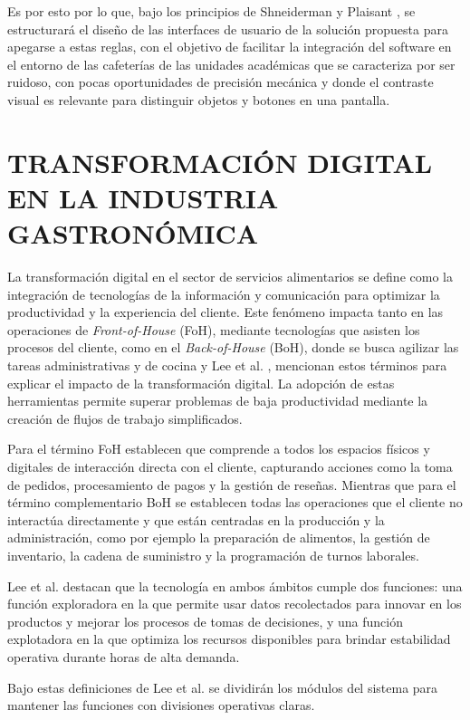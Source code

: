 Es por esto por lo que, bajo los principios de Shneiderman y Plaisant \cite{shneiderman2005designing}, se estructurará el diseño de las interfaces de usuario de la solución propuesta para apegarse a estas reglas, con el objetivo de facilitar la integración del software en el entorno de las cafeterías de las unidades académicas que se caracteriza por ser ruidoso, con pocas oportunidades de precisión mecánica y donde el contraste visual es relevante para distinguir objetos y botones en una pantalla.

\section{TRANSFORMACIÓN DIGITAL EN LA INDUSTRIA GASTRONÓMICA}
La transformación digital en el sector de servicios alimentarios se define como la integración de tecnologías de la información y comunicación para optimizar la productividad y la experiencia del cliente. Este fenómeno impacta tanto en las operaciones de \textit{Front-of-House} (FoH), mediante tecnologías que asisten los procesos del cliente, como en el \textit{Back-of-House} (BoH), donde se busca agilizar las tareas administrativas y de cocina y Lee et al. \cite{woojin2024effect}, \cite{woojin2026multifaceted} mencionan estos términos para explicar el impacto de la transformación digital. La adopción de estas herramientas permite superar problemas de baja productividad mediante la creación de flujos de trabajo simplificados.

Para el término FoH establecen que comprende a todos los espacios físicos y digitales de interacción directa con el cliente, capturando acciones como la toma de pedidos, procesamiento de pagos y la gestión de reseñas. Mientras que para el término complementario BoH se establecen todas las operaciones que el cliente no interactúa directamente y que están centradas en la producción y la administración, como por ejemplo la preparación de alimentos, la gestión de inventario, la cadena de suministro y la programación de turnos laborales. 

Lee et al. destacan que la tecnología en ambos ámbitos cumple dos funciones: una función exploradora en la que permite usar datos recolectados para innovar en los productos y mejorar los procesos de tomas de decisiones, y una función explotadora en la que optimiza los recursos disponibles para brindar estabilidad operativa durante horas de alta demanda. 

Bajo estas definiciones de Lee et al. \cite{woojin2026multifaceted} se dividirán los módulos del sistema para mantener las funciones con divisiones operativas claras. 

